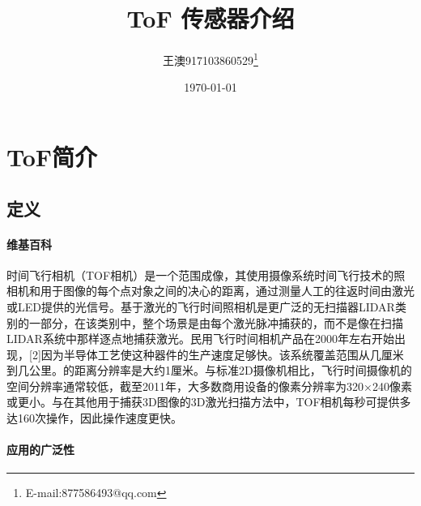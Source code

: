 \documentclass[UTF8]{ctexart}
\title{ToF 传感器介绍}
\author{王澳917103860529\thanks{E-mail:877586493@qq.com}}
\date{\today}
\begin{document}
	
\maketitle

\section{ToF简介}
\subsection{定义}
\paragraph{维基百科}
时间飞行相机（TOF相机）是一个范围成像，其使用摄像系统时间飞行技术的照相机和用于图像的每个点对象之间的决心的距离，通过测量人工的往返时间由激光或LED提供的光信号。基于激光的飞行时间照相机是更广泛的无扫描器LIDAR类别的一部分，在该类别中，整个场景是由每个激光脉冲捕获的，而不是像在扫描LIDAR系统中那样逐点地捕获激光。民用飞行时间相机产品在2000年左右开始出现，[2]因为半导体工艺使这种器件的生产速度足够快。该系统覆盖范围从几厘米到几公里。的距离分辨率是大约1厘米。与标准2D摄像机相比，飞行时间摄像机的空间分辨率通常较低，截至2011年，大多数商用设备的像素分辨率为320×240像素或更小。与在其他用于捕获3D图像的3D激光扫描方法中，TOF相机每秒可提供多达160次操作，因此操作速度更快。
\paragraph{应用的广泛性}
\end{document}
